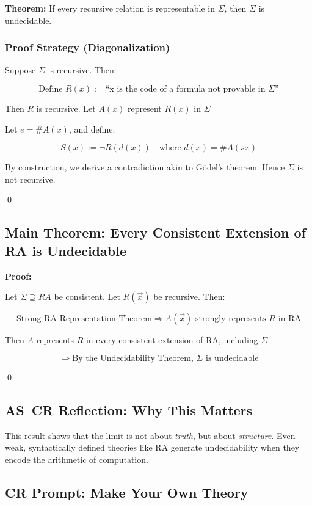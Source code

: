 \documentclass[12pt]{article}
\begin{document}
\textbf{Theorem:} If every recursive relation is representable in \( \Sigma \), then \( \Sigma \) is undecidable.

\subsubsection*{Proof Strategy (Diagonalization)}

Suppose \( \Sigma \) is recursive. Then:

\[
\text{Define } R(x) := \text{“x is the code of a formula not provable in } \Sigma \text{”}
\]

Then \( R \) is recursive. Let \( A(x) \) represent \( R(x) \) in \( \Sigma \)

Let \( e = \#A(x) \), and define:

\[
S(x) := \neg R(d(x)) \quad \text{where } d(x) = \#A(sx)
\]

By construction, we derive a contradiction akin to Gödel’s theorem. Hence \( \Sigma \) is not recursive.

\qed

\subsection{Main Theorem: Every Consistent Extension of RA is Undecidable}

\textbf{Proof:}

Let \( \Sigma \supseteq RA \) be consistent. Let \( R(\vec{x}) \) be recursive. Then:

\[
\text{Strong RA Representation Theorem} \Rightarrow A(\vec{x}) \text{ strongly represents } R \text{ in RA}
\]

Then \( A \) represents \( R \) in every consistent extension of RA, including \( \Sigma \)

\[
\Rightarrow \text{By the Undecidability Theorem, } \Sigma \text{ is undecidable}
\]

\qed

\subsection*{AS–CR Reflection: Why This Matters}

This result shows that the limit is not about \emph{truth}, but about \emph{structure}. Even weak, syntactically defined theories like RA generate undecidability when they encode the arithmetic of computation.

\subsection*{CR Prompt: Make Your Own Theory}
\end{document}
